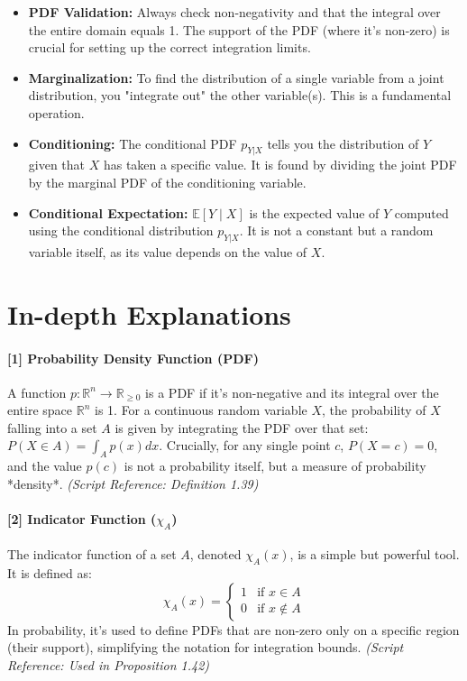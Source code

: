\documentclass[11pt,a4paper]{article}
\begin{document}
\begin{itemize}
    \item \textbf{PDF Validation:} Always check non-negativity and that the integral over the entire domain equals 1. The support of the PDF (where it's non-zero) is crucial for setting up the correct integration limits.
    \item \textbf{Marginalization:} To find the distribution of a single variable from a joint distribution, you "integrate out" the other variable(s). This is a fundamental operation.
    \item \textbf{Conditioning:} The conditional PDF $p_{Y|X}$ tells you the distribution of $Y$ given that $X$ has taken a specific value. It is found by dividing the joint PDF by the marginal PDF of the conditioning variable.
    \item \textbf{Conditional Expectation:} $\mathbb{E}[Y \mid X]$ is the expected value of $Y$ computed using the conditional distribution $p_{Y|X}$. It is not a constant but a random variable itself, as its value depends on the value of $X$.
\end{itemize}

\hrulefill
\vspace{1cm}

\section{In-depth Explanations}

\hypertarget{ref:pdf}{}
\paragraph{[1] Probability Density Function (PDF)}
A function $p: \mathbb{R}^n \to \mathbb{R}_{\ge 0}$ is a PDF if it's non-negative and its integral over the entire space $\mathbb{R}^n$ is 1. For a continuous random variable $X$, the probability of $X$ falling into a set $A$ is given by integrating the PDF over that set: $P(X \in A) = \int_A p(x) dx$. Crucially, for any single point $c$, $P(X=c) = 0$, and the value $p(c)$ is not a probability itself, but a measure of probability *density*.
\textit{(Script Reference: Definition 1.39)}
\vspace{1em}

\hypertarget{ref:indicator}{}
\paragraph{[2] Indicator Function ($\chi_A$)}
The indicator function of a set $A$, denoted $\chi_A(x)$, is a simple but powerful tool. It is defined as:
\[ \chi_A(x) =
\begin{cases}
1 & \text{if } x \in A \\
0 & \text{if } x \notin A
\end{cases}
\]
In probability, it's used to define PDFs that are non-zero only on a specific region (their support), simplifying the notation for integration bounds.
\textit{(Script Reference: Used in Proposition 1.42)}
\vspace{1em}
\end{document}
